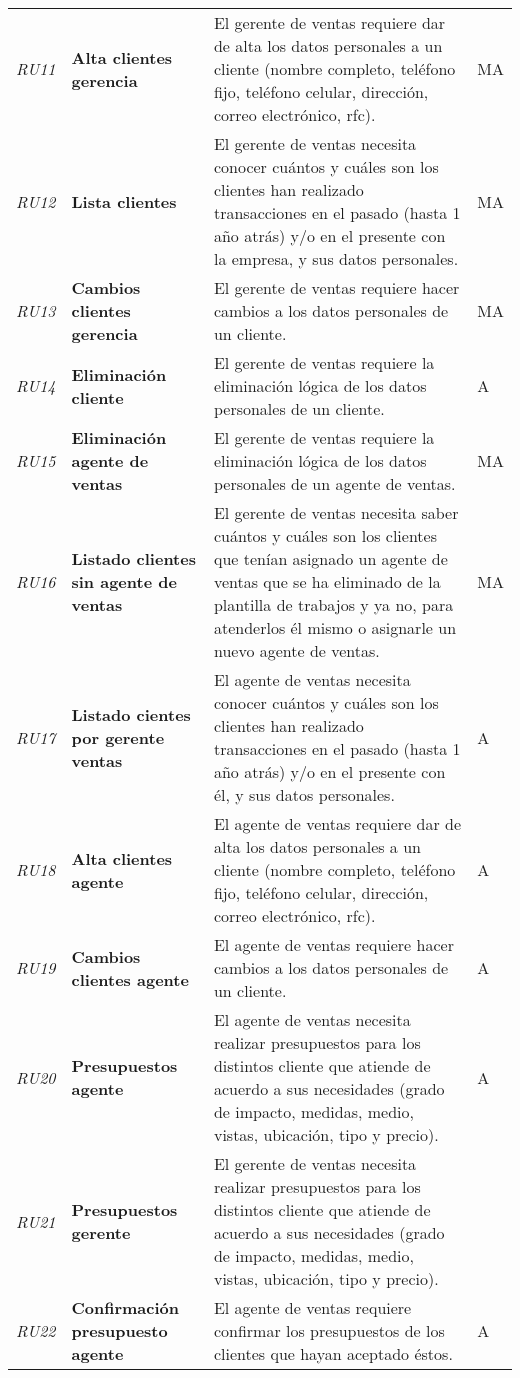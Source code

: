 \begin{longtable}[H]{m{2cm}m{3cm}m{5cm}m{2cm}}
\textit{RU11} &\textbf{Alta clientes gerencia} & El gerente de ventas requiere dar de alta los datos personales a un cliente (nombre completo, teléfono fijo, teléfono celular, dirección, correo electrónico, rfc). & MA\tabularnewline
\textit{RU12} &\textbf{Lista clientes} & El gerente de ventas necesita conocer cuántos y cuáles son los clientes han realizado transacciones en el pasado (hasta 1 año atrás) y/o en el presente con la empresa, y sus datos personales.  & MA\tabularnewline
\textit{RU13} &\textbf{Cambios clientes gerencia} & El gerente de ventas requiere hacer cambios a los datos personales de un cliente. & MA\tabularnewline
\textit{RU14} &\textbf{Eliminación cliente} & El gerente de ventas requiere la eliminación lógica de los datos personales de un cliente. & A\tabularnewline
\textit{RU15} &\textbf{Eliminación agente de ventas} & El gerente de ventas requiere la eliminación lógica de los datos personales de un agente de ventas. & MA\tabularnewline
\textit{RU16} &\textbf{Listado clientes sin agente de ventas} & El gerente de ventas necesita saber cuántos y cuáles son los clientes que tenían asignado un agente de ventas que se ha eliminado de la plantilla de trabajos y ya no, para atenderlos él mismo o asignarle un nuevo agente de ventas. & MA\tabularnewline
\textit{RU17} &\textbf{Listado cientes por gerente ventas} & El agente de ventas necesita conocer cuántos y cuáles son los clientes han realizado transacciones en el pasado (hasta 1 año atrás) y/o en el presente con él, y sus datos personales. & A\tabularnewline
\textit{RU18} &\textbf{Alta clientes agente} & El agente de ventas requiere dar de alta los datos personales a un cliente (nombre completo, teléfono fijo, teléfono celular, dirección, correo electrónico, rfc). & A\tabularnewline
\textit{RU19} &\textbf{Cambios clientes agente} & El agente de ventas requiere hacer cambios a los datos personales de un cliente. & A\tabularnewline
\textit{RU20} &\textbf{Presupuestos agente} & El agente de ventas necesita realizar presupuestos para los distintos cliente que atiende de acuerdo a sus necesidades (grado de impacto, medidas, medio, vistas, ubicación, tipo y precio). & A\tabularnewline
\textit{RU21} &\textbf{Presupuestos gerente} & El gerente de ventas necesita realizar presupuestos para los distintos cliente que atiende de acuerdo a sus necesidades (grado de impacto, medidas, medio, vistas, ubicación, tipo y precio). &\tabularnewline
\textit{RU22} &\textbf{Confirmación presupuesto agente} & El agente de ventas requiere confirmar los presupuestos de los clientes que hayan aceptado éstos. & A\tabularnewline

\end{longtable}
